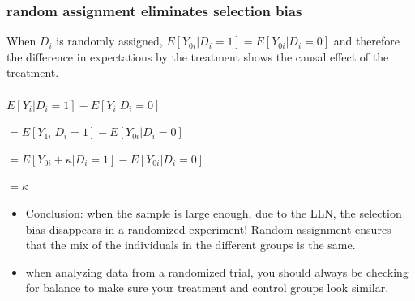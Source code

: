 \documentclass{beamer}
\begin{document}
\begin{frame}
\frametitle{random assignment eliminates selection bias}
When $D_i$ is randomly assigned, $E[Y_{0i}|D_i=1] = E[Y_{0i}|D_i=0]$ and therefore the difference in expectations by the treatment shows the causal effect of the treatment.\\~\\

$E[Y_i|D_i=1]-E[Y_i|D_i=0]$

$=E[Y_{1i}|D_i=1] - E[Y_{0i}|D_i=0]$

$=E[Y_{0i} + \kappa|D_i=1] - E[Y_{0i}|D_i=0]$

$=\kappa$ 

\begin{itemize}
\item Conclusion: when the sample is large enough, due to the LLN, the selection bias disappears in a randomized experiment! Random assignment ensures that the mix of the individuals in the different groups is the same.
\item when analyzing data from a randomized trial, you should always be checking for balance to make sure your treatment and control groups look similar.
\end{itemize}
\end{frame}
\end{document}
